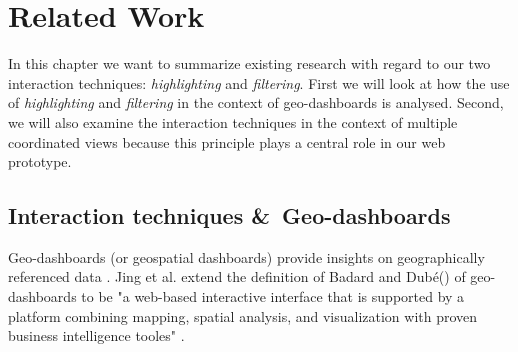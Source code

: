 \chapter{Related Work}
In this chapter we want to summarize existing research with regard to our two interaction techniques:
\textit{highlighting} and \textit{filtering}. First we will look at how the use of \textit{highlighting}
and \textit{filtering} in the context of geo-dashboards is analysed. Second, we will also examine the
interaction techniques in the context of multiple coordinated views because this principle plays a central
role in our web prototype.

\section{Interaction techniques \&\ Geo-dashboards}
Geo-dashboards (or geospatial dashboards) provide insights on geographically referenced data \citep*{Bernasocchi.2012}.
Jing et al. extend the definition of Badard and Dubé(\citep*{ThierryBadard.2009}) of geo-dashboards to be "a web-based interactive interface that is supported by a platform combining
mapping, spatial analysis, and visualization with proven business intelligence tooles" \citep*{Jing.2019}.

